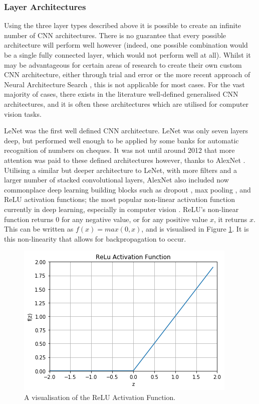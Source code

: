 \subsubsection{Layer Architectures}\label{ch:Background,sec:CNN,sub:CNN,subsub:layerArchitecture}

Using the three layer types described above it is possible to create an infinite number of CNN architectures. There is no guarantee that every possible architecture will perform well however (indeed, one possible combination would be a single fully connected layer, which would not perform well at all). Whilst it may be advantageous for certain areas of research to create their own custom CNN architecture, either through trial and error or the more recent approach of Neural Architecture Search \cite{elsken_neural_2018}, this is not applicable for most cases. For the vast majority of cases, there exists in the literature well-defined generalised CNN architectures, and it is often these architectures which are utilised for computer vision tasks. 

LeNet \cite{lecun_gradient-based_1998} was the first well defined CNN architecture. LeNet was only seven layers deep, but performed well enough to be applied by some banks for automatic recognition of numbers on cheques. It was not until around 2012 that more attention was paid to these defined architectures however, thanks to AlexNet \cite{krizhevsky_imagenet_2012}. Utilising a similar but deeper architecture to LeNet, with more filters and a larger number of stacked convolutional layers, AlexNet also included now commonplace deep learning building blocks such as dropout \cite{srivastava_dropout:_2014}, max pooling \cite{boureau_theoretical_2010}, and ReLU activation functions; the most popular non-linear activation function currently in deep learning, especially in computer vision \cite{he_delving_2015}. ReLU's non-linear function returns 0 for any negative value, or for any positive value $x$, it returns $x$. This can be written as $f(x) = max(0,x)$, and is visualised in Figure \ref{fig:relu}. It is this non-linearity that allows for backpropagation to occur.

\begin{figure}
	\begin{center}
		\includegraphics[scale=0.6]{Chapter2/figs/relu.png}
	\end{center}
	\caption{A visualisation of the ReLU Activation Function.}
	\label{fig:relu}
\end{figure}

